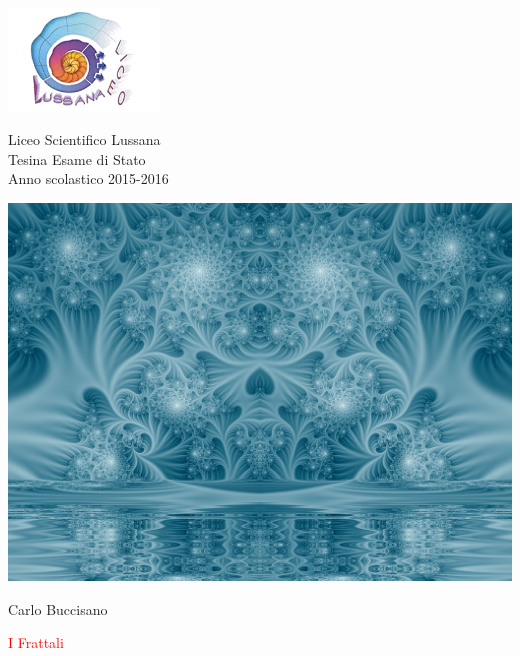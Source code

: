 \documentclass[10pt]{report}
\begin{document}
	\begin{titlepage}
		\begin{minipage}{0.3\textwidth}
			\includegraphics[width=0.3\textwidth]{Copertina/logo}
		\end{minipage}
		\hfill
		\begin{minipage}{0.6\textwidth}\raggedleft
			Liceo Scientifico Lussana\\
			Tesina Esame di Stato\\
			Anno scolastico 2015-2016
		\end{minipage}
		\centering
		\begin{center}
			\includegraphics[width=1\linewidth]{Copertina/blue_lagoon}
		\end{center}
		{\Large Carlo Buccisano\par}
		\vspace{1cm}
		\textcolor{red}{\Huge{I Frattali}}
		\par
	\end{titlepage}
	
\end{document}

